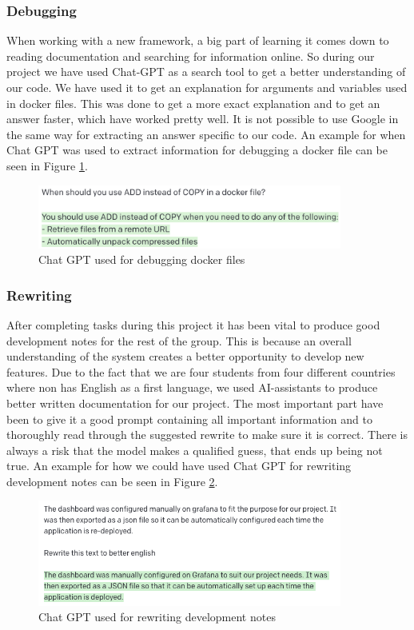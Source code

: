 \documentclass{article}
\begin{document}
\subsubsection{Debugging}
When working with a new framework, a big part of learning it comes down to reading documentation and searching for information online. So during our project we have used Chat-GPT as a search tool to get a better understanding of our code. We have used it to get an explanation for arguments and variables used in docker files. This was done to get a more exact explanation and to get an answer faster, which have worked pretty well. It is not possible to use Google in the same way for extracting an answer specific to our code. An example for when Chat GPT was used to extract information for debugging a docker file can be seen in Figure \ref{fig:gptdebugging}.

\begin{figure}[H]
    \includegraphics[width=10cm]{images/gptdebugging.png}
    \centering
    \caption{Chat GPT used for debugging docker files}
    \label{fig:gptdebugging}
\end{figure}

\subsubsection{Rewriting}
After completing tasks during this project it has been vital to produce good development notes for the rest of the group. This is because an overall understanding of the system creates a better opportunity to develop new features. Due to the fact that we are four students from four different countries where non has English as a first language, we used AI-assistants to produce better written documentation for our project. The most important part have been to give it a good prompt containing all important information and to thoroughly read through the suggested rewrite to make sure it is correct. There is always a risk that the model makes a qualified guess, that ends up being not true. An example for how we could have used Chat GPT for rewriting development notes can be seen in Figure \ref{fig:gtprewrite}.

\begin{figure}[H]
    \includegraphics[width=10cm]{images/gptrewrite.png}
    \centering
    \caption{Chat GPT used for rewriting development notes}
    \label{fig:gtprewrite}
\end{figure}
\end{document}
